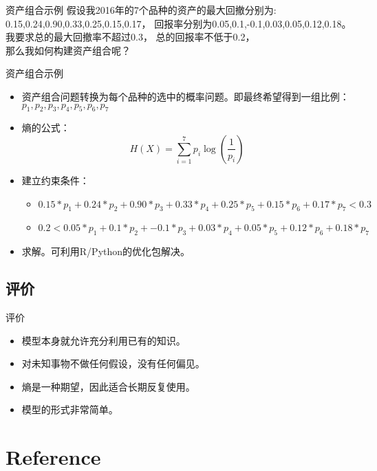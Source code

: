 \documentclass{beamer}
\begin{document}
\begin{frame}{资产组合示例}
  假设我2016年的7个品种的资产的最大回撤分别为: 0.15,0.24,0.90,0.33,0.25,0.15,0.17， 回报率分别为0.05,0.1,-0.1,0.03,0.05,0.12,0.18。 \\我要求总的最大回撤率不超过0.3， 总的回报率不低于0.2， \\那么我如何构建资产组合呢？
\end{frame}
\begin{frame}{资产组合示例}
  \begin{itemize}
    \item 资产组合问题转换为每个品种的选中的概率问题。即最终希望得到一组比例：$p_1,p_2,p_3,p_4,p_5,p_6,p_7$
    \item 熵的公式：
  \begin{equation}
    H(X)= \sum_{i=1}^{7} p_i\log(\frac{1}{p_i})
  \end{equation}
\item 建立约束条件：
  \begin{itemize}
    \item $ 0.15*p_1 + 0.24*p_2 + 0.90*p_3 + 0.33*p_4 + 0.25*p_5 + 0.15*p_6 + 0.17*p_7 < 0.3 $
    \item $ 0.2< 0.05*p_1 + 0.1*p_2 + -0.1*p_3 + 0.03*p_4 + 0.05*p_5 + 0.12*p_6 + 0.18*p_7 $
  \end{itemize}
\item 求解。可利用R/Python的优化包解决。

  \end{itemize}
\end{frame}

\subsection{评价}
\begin{frame}{评价}
  \begin{itemize}
    \item 模型本身就允许充分利用已有的知识。
    \item 对未知事物不做任何假设，没有任何偏见。
    \item 熵是一种期望，因此适合长期反复使用。
    \item 模型的形式非常简单。
  \end{itemize}
\end{frame}

\section{Reference}
\end{document}
